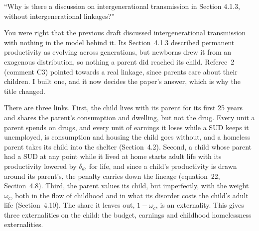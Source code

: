 \documentclass[11pt]{article}
\begin{document}
\begin{referee}
``Why is there a discussion on intergenerational transmission in Section 4.1.3,
without intergenerational linkages?''
\end{referee}
\begin{response}
\newresult You were right that the previous draft discussed intergenerational
transmission with nothing in the model behind it. Its Section~4.1.3 described
permanent productivity as evolving across generations, but newborns drew it from an
exogenous distribution, so nothing a parent did reached its child. Referee~2
(comment C3) pointed towards a real linkage, since parents care about their
children. I built one, and it now decides the paper's answer, which is why the
title changed.

There are three links. First, the child lives with its parent for its first 25
years and shares the parent's consumption and dwelling, but not the drug. Every
unit a parent spends on drugs, and every unit of earnings it loses while a SUD
keeps it unemployed, is consumption and housing the child goes without, and a
homeless parent takes its child into the shelter (Section~4.2). Second, a child
whose parent had a SUD at any point while it lived at home starts adult life with
its productivity lowered by $\delta_d$, for life, and since a child's productivity
is drawn around its parent's, the penalty carries down the lineage (equation~22,
Section~4.8). Third, the parent values its child, but imperfectly, with the weight
$\omega_c$, both in the flow of childhood and in what its disorder costs the
child's adult life (Section~4.10). The share it leaves out, $1-\omega_c$, is an
externality. This gives three externalities on the child: the budget, earnings and
childhood homelessness externalities.


\end{response}
\end{document}

